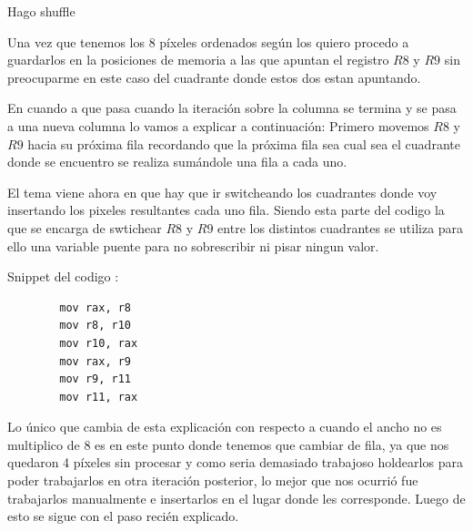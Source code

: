 Hago shuffle 



Una vez que tenemos los 8 píxeles ordenados según los quiero procedo a guardarlos en la posiciones de memoria a las que apuntan el registro $R8$ y $R9$ sin preocuparme en este caso del cuadrante donde estos dos estan apuntando.

En cuando a que pasa cuando la iteración sobre la columna se termina y se pasa a una nueva columna lo vamos a explicar a continuación:
Primero movemos $R8$ y $R9$ hacia su próxima fila recordando que la próxima fila sea cual sea el cuadrante donde se encuentro se realiza sumándole una fila a cada uno.

El tema viene ahora en que hay que ir switcheando los cuadrantes donde voy insertando los pixeles resultantes cada uno fila. Siendo esta parte del codigo la que se encarga de swtichear $R8$ y $R9$ entre los distintos cuadrantes se utiliza para ello una variable puente para no sobrescribir ni pisar ningun valor. 

Snippet del codigo :

\begin{lstlisting}
		mov rax, r8
		mov r8, r10
		mov r10, rax
		mov rax, r9
		mov r9, r11
		mov r11, rax
\end{lstlisting}

Lo único que cambia de esta explicación con respecto a cuando el ancho no es multiplico de 8 es en este punto donde tenemos que cambiar de fila, ya que nos quedaron 4 píxeles sin procesar y como seria demasiado trabajoso holdearlos para poder trabajarlos en otra iteración posterior, lo mejor que nos ocurrió fue trabajarlos manualmente e insertarlos en el lugar donde les corresponde. Luego de esto se sigue con el paso recién explicado.


